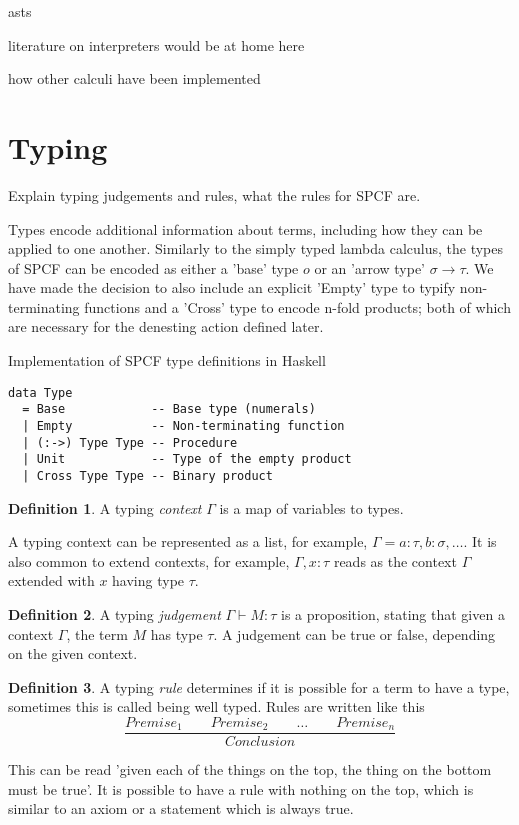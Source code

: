 \documentclass[12pt,a4paper]{report}
\theoremstyle{definition}
\newtheorem{definition}{Definition}[chapter]%
\theoremstyle{remark}
\begin{document}
asts

literature on interpreters would be at home here

how other calculi have been implemented

\section{Typing}
Explain typing judgements and rules, what the rules for SPCF are.

Types encode additional information about terms, including how they can be applied to one another. Similarly to the simply typed lambda calculus, the types of SPCF can be encoded as either a 'base' type $o$ or an 'arrow type' $\sigma \rightarrow \tau$. We have made the decision to also include an explicit 'Empty' type to typify non-terminating functions and a 'Cross' type to encode n-fold products; both of which are necessary for the denesting action defined later.

\begin{listing}[!ht]
\caption{Implementation of SPCF type definitions in Haskell}
\begin{verbatim}
data Type
  = Base            -- Base type (numerals)
  | Empty           -- Non-terminating function
  | (:->) Type Type -- Procedure
  | Unit            -- Type of the empty product
  | Cross Type Type -- Binary product
\end{verbatim}
\label{listing:type-adt}
\end{listing}

\begin{definition}
    A typing \emph{context} $\Gamma$ is a map of variables to types.
\end{definition}

A typing context can be represented as a list, for example, $\Gamma = a:\tau, b:\sigma, \ldots$. It is also common to extend contexts, for example, $\Gamma, x:\tau$ reads as the context $\Gamma$ extended with $x$ having type $\tau$. 

\begin{definition}
    A typing \emph{judgement} $\Gamma \vdash M:\tau$ is a proposition, stating that given a context $\Gamma$, the term $M$ has type $\tau$. A judgement can be true or false, depending on the given context.
\end{definition}

\begin{definition}
    A typing \emph{rule} determines if it is possible for a term to have a type, sometimes this is called being well typed. Rules are written like this
    \[
    \frac{Premise_1 \quad\quad Premise_2 \quad\quad \ldots \quad\quad Premise_n}{Conclusion}
    \]

    This can be read 'given each of the things on the top, the thing on the bottom must be true'. It is possible to have a rule with nothing on the top, which is similar to an axiom or a statement which is always true.
\end{definition}
\end{document}
